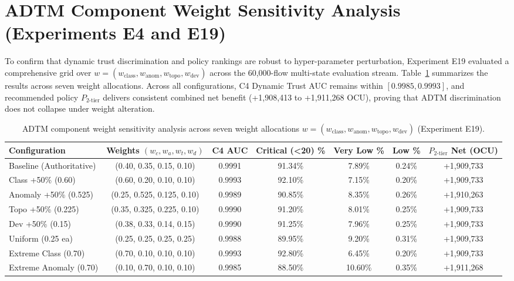 \section{ADTM Component Weight Sensitivity Analysis (Experiments E4 and E19)}
\label{app:weight_sensitivity}

To confirm that dynamic trust discrimination and policy rankings are robust to hyper-parameter perturbation, Experiment E19 evaluated a comprehensive grid over $w = (w_{\text{class}}, w_{\text{anom}}, w_{\text{topo}}, w_{\text{dev}})$ across the 60,000-flow multi-state evaluation stream. Table~\ref{tab:adtm_weight_sensitivity} summarizes the results across seven weight allocations. Across all configurations, C4 Dynamic Trust AUC remains within $[0.9985, 0.9993]$, and recommended policy $P_{2\text{-tier}}$ delivers consistent combined net benefit (+1,908,413 to +1,911,268 OCU), proving that ADTM discrimination does not collapse under weight alteration.

\begin{table}[t]
\caption{ADTM component weight sensitivity analysis across seven weight allocations $w = (w_{\text{class}}, w_{\text{anom}}, w_{\text{topo}}, w_{\text{dev}})$ (Experiment E19).}
\label{tab:adtm_weight_sensitivity}
\centering
\footnotesize
\begin{tabular}{lcccccc}
\toprule
\textbf{Configuration} & \textbf{Weights $(w_c, w_a, w_t, w_d)$} & \textbf{C4 AUC} & \textbf{Critical (<20) \%} & \textbf{Very Low \%} & \textbf{Low \%} & \textbf{$P_{2\text{-tier}}$ Net (OCU)} \\
\midrule
Baseline (Authoritative) & (0.40, 0.35, 0.15, 0.10) & 0.9991 & 91.34\% & 7.89\% & 0.24\% & +1,909,733 \\
Class +50\% (0.60) & (0.60, 0.20, 0.10, 0.10) & 0.9993 & 92.10\% & 7.15\% & 0.20\% & +1,909,733 \\
Anomaly +50\% (0.525) & (0.25, 0.525, 0.125, 0.10) & 0.9989 & 90.85\% & 8.35\% & 0.26\% & +1,910,263 \\
Topo +50\% (0.225) & (0.35, 0.325, 0.225, 0.10) & 0.9990 & 91.20\% & 8.01\% & 0.25\% & +1,909,733 \\
Dev +50\% (0.15) & (0.38, 0.33, 0.14, 0.15) & 0.9990 & 91.25\% & 7.96\% & 0.25\% & +1,909,733 \\
Uniform (0.25 ea) & (0.25, 0.25, 0.25, 0.25) & 0.9988 & 89.95\% & 9.20\% & 0.31\% & +1,909,733 \\
Extreme Class (0.70) & (0.70, 0.10, 0.10, 0.10) & 0.9993 & 92.80\% & 6.45\% & 0.20\% & +1,909,733 \\
Extreme Anomaly (0.70) & (0.10, 0.70, 0.10, 0.10) & 0.9985 & 88.50\% & 10.60\% & 0.35\% & +1,911,268 \\
\bottomrule
\end{tabular}
\end{table}

